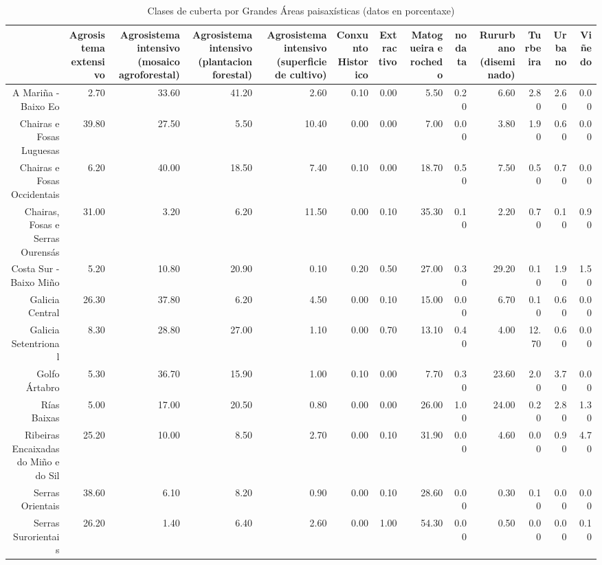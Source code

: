 \begin{table}[p]
\centering
\caption{Clases de cuberta por Grandes Áreas paisaxísticas (datos en porcentaxe)} 
\label{xtaboa2p}
\begin{tabular}{rrrrrrrrrrrrr}
  \hline
 & Agrosistema extensivo & Agrosistema intensivo (mosaico agroforestal) & Agrosistema intensivo (plantacion forestal) & Agrosistema intensivo (superficie de cultivo) & Conxunto Historico & Extractivo & Matogueira e rochedo & no data & Rururbano (diseminado) & Turbeira & Urbano & Viñedo \\ 
  \hline
A Mariña - Baixo Eo & 2.70 & 33.60 & 41.20 & 2.60 & 0.10 & 0.00 & 5.50 & 0.20 & 6.60 & 2.80 & 2.60 & 0.00 \\ 
  Chairas e Fosas Luguesas & 39.80 & 27.50 & 5.50 & 10.40 & 0.00 & 0.00 & 7.00 & 0.00 & 3.80 & 1.90 & 0.60 & 0.00 \\ 
  Chairas e Fosas Occidentais & 6.20 & 40.00 & 18.50 & 7.40 & 0.10 & 0.00 & 18.70 & 0.50 & 7.50 & 0.50 & 0.70 & 0.00 \\ 
  Chairas, Fosas e Serras Ourensás & 31.00 & 3.20 & 6.20 & 11.50 & 0.00 & 0.10 & 35.30 & 0.10 & 2.20 & 0.70 & 0.10 & 0.90 \\ 
  Costa Sur - Baixo Miño & 5.20 & 10.80 & 20.90 & 0.10 & 0.20 & 0.50 & 27.00 & 0.30 & 29.20 & 0.10 & 1.90 & 1.50 \\ 
  Galicia Central & 26.30 & 37.80 & 6.20 & 4.50 & 0.00 & 0.10 & 15.00 & 0.00 & 6.70 & 0.10 & 0.60 & 0.00 \\ 
  Galicia Setentrional & 8.30 & 28.80 & 27.00 & 1.10 & 0.00 & 0.70 & 13.10 & 0.40 & 4.00 & 12.70 & 0.60 & 0.00 \\ 
  Golfo Ártabro & 5.30 & 36.70 & 15.90 & 1.00 & 0.10 & 0.00 & 7.70 & 0.30 & 23.60 & 2.00 & 3.70 & 0.00 \\ 
  Rías Baixas & 5.00 & 17.00 & 20.50 & 0.80 & 0.00 & 0.00 & 26.00 & 1.00 & 24.00 & 0.20 & 2.80 & 1.30 \\ 
  Ribeiras Encaixadas do Miño e do Sil & 25.20 & 10.00 & 8.50 & 2.70 & 0.00 & 0.10 & 31.90 & 0.00 & 4.60 & 0.00 & 0.90 & 4.70 \\ 
  Serras Orientais & 38.60 & 6.10 & 8.20 & 0.90 & 0.00 & 0.10 & 28.60 & 0.00 & 0.30 & 0.10 & 0.00 & 0.00 \\ 
  Serras Surorientais & 26.20 & 1.40 & 6.40 & 2.60 & 0.00 & 1.00 & 54.30 & 0.00 & 0.50 & 0.00 & 0.00 & 0.10 \\ 
   \hline
\end{tabular}
\end{table}
